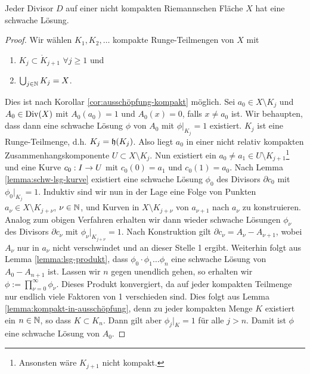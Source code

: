 \begin{lemma}
  \label{lemma:schwache-Lösung-Divisor}
  Jeder Divisor $D$ auf einer nicht kompakten Riemannschen Fläche $X$ hat eine
  schwache Lösung.
\end{lemma}

\begin{proof}
  Wir wählen $K_1, K_2, \dots$ kompakte Runge-Teilmengen von $X$ mit
  \begin{enumerate}
  \item $K_j \subset \mathring{K}_{j+1}$ $\forall j \geq 1$ und
  \item $\bigcup_{j \in \mathbb{N}} K_j = X$.
  \end{enumerate}
  Dies ist nach Korollar \ref{cor:ausschöpfung-kompakt} möglich.
  Sei $a_0 \in X \setminus K_j$ und $A_0 \in \operatorname{Div}(X)$
  mit $A_0(a_0) = 1$ und $A_0(x) = 0$, falls $x \neq a_0$ ist. Wir
  behaupten, dass dann eine schwache Lösung $\phi$ von $A_0$ mit $\phi |_{K_j}
  = 1$ existiert. 
  $K_j$ ist eine Runge-Teilmenge, d.h. $K_j = \mathfrak{h}(K_j)$. Also
  liegt $a_0$ in einer nicht relativ kompakten
  Zusammenhangskomponente $U \subset X \setminus K_j$.
  Nun existiert ein $a_0 \neq a_1 \in U \setminus K_{j+1}$\footnote{Ansonsten wäre
  $K_{j+1}$ nicht kompakt.} und eine Kurve $c_0: I \rightarrow U$ mit
  $c_0(0)=a_1$ und \break$c_0(1) = a_0$. 
  Nach Lemma \ref{lemma:schw-lsg-kurve} existiert eine schwache Lösung
  $\phi_0$ des Divisors $\partial c_0$ mit $\phi_0|_{K_j} = 1$. 
  Induktiv sind wir nun in der Lage eine Folge von Punkten $a_\nu \in
  X \setminus K_{j+ \nu}$, $\nu \in \mathbb{N}$, und Kurven in $X \setminus
  K_{j+\nu}$ von $a_{\nu+1}$ nach $a_\nu$ zu konstruieren. Analog zum
  obigen Verfahren erhalten wir dann wieder schwache Lösungen
  $\phi_\nu$ des Divisors $\partial c_\nu$ mit $\phi_\nu |_{K_{j+\nu}}
  = 1$. 
  Nach Konstruktion gilt $\partial c_\nu = A_\nu - A_{\nu+1}$, wobei
  $A_\nu$ nur in $a_\nu$ nicht verschwindet und an dieser Stelle 1
  ergibt.
  Weiterhin folgt aus Lemma \ref{lemma:lsg-produkt}, dass $\phi_0 \cdot \phi_1 \dots \phi_n$ eine
  schwache Lösung von $A_0 - A_{n+1}$ ist.
  Lassen wir $n$ gegen unendlich gehen, so erhalten wir $\phi :=
  \prod_{\nu = 0}^\infty \phi_\nu$. Dieses Produkt konvergiert, da
  auf jeder kompakten Teilmenge nur endlich viele Faktoren von 1
  verschieden sind. Dies folgt aus Lemma
  \ref{lemma:kompakt-in-ausschöpfung}, denn zu jeder kompakten Menge
  $K$ existiert ein $n \in \mathbb{N}$, so dass $K \subset K_n$. Dann gilt
  aber $\phi_j |_K = 1$ für alle $j > n$.
  Damit ist $\phi$ eine schwache Lösung von $A_0$.
  

\end{proof}
